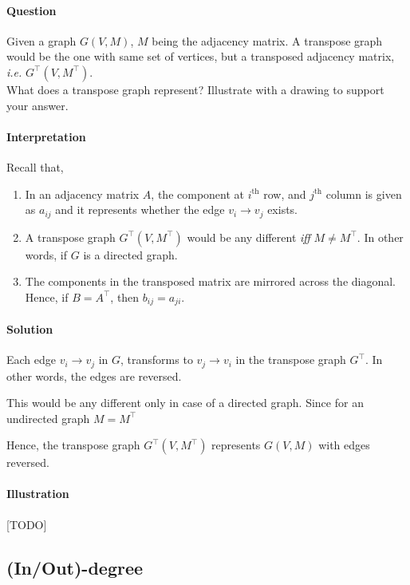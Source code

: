 \documentclass[11pt]{article}
\begin{document}
\paragraph*{Question}
\label{sec:orga737397}
Given a graph \(G(V,M)\), \(M\) being the adjacency matrix.
A transpose graph would be the one with same set of
vertices, but a transposed adjacency matrix, \emph{i.e.}
\(G^{\top}(V,M^{\top})\). \\[0pt]
What does a transpose graph represent?  Illustrate with
a drawing to support your answer.

\paragraph*{Interpretation}
\label{sec:orgf3a6cdf}
Recall that,
\begin{enumerate}
\item In an adjacency matrix \(A\), the component at
\(i^{\text{th}}\) row, and \(j^{\text{th}}\) column is
given as \(a_{ij}\) and it represents whether the edge
\(v_{i}\to v_{j}\) exists.
\item A transpose graph \(G^{\top}(V,M^{\top})\) would be
any different \emph{iff} \(M\ne M^{\top}\).  In other
words, if \(G\) is a directed graph.
\item The components in the transposed matrix are mirrored
across the diagonal.  Hence, if \(B = A^{\top}\), then
\(b_{ij} = a_{ji}\).
\end{enumerate}

\paragraph*{Solution}
\label{sec:org21ad9e5}

Each edge \(v_{i}\to v_{j}\) in \(G\), transforms to
\(v_{j}\to v_{i}\) in the transpose graph \(G^{\top}\).
In other words, the edges are reversed.

This would be any different only in case of a directed
graph.  Since for an undirected graph \(M=M^{\top}\)

Hence, the transpose graph \(G^{\top}(V,M^{\top})\)
represents \(G(V,M)\) with edges reversed.

\paragraph*{Illustration}
\label{sec:orgb295938}

[TODO]

\subsection{(In/Out)-degree}
\label{sec:org8f88daf}
\end{document}
